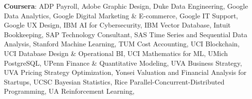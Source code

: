 \textbf{Coursera}: ADP Payroll, Adobe Graphic Design, Duke Data Engineering, Google Data Analytics, Google Digital Marketing \& E-commerce, Google IT Support, Google UX Design, IBM AI for Cybersecurity, IBM Vector Database, Intuit Bookkeeping, SAP Technology Consultant, SAS Time Series and Sequential Data Analysis, Stanford Machine Learning, TUM Cost Accounting, UCI Blockchain, UCI Database Design \& Operational BI, UCI Mathematics for ML, UMich PostgreSQL, UPenn Finance \& Quantitative Modeling, UVA Business Strategy, UVA Pricing Strategy Optimization, Yonsei Valuation and Financial Analysis for Startups, UCSC Bayesian Statistics, Rice Parallel-Concurrent-Distributed Programming, UA Reinforcement Learning, 
